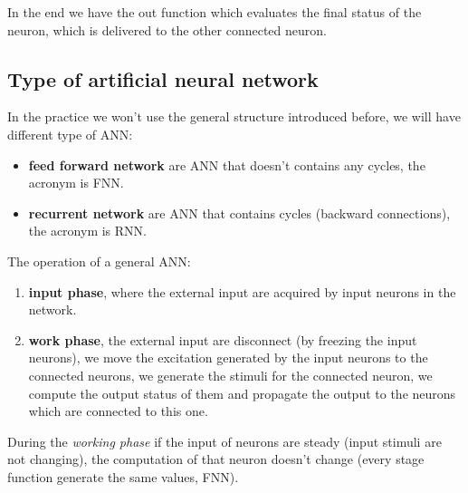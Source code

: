 \documentclass{article}
\begin{document}
In the end we have the out function which evaluates the final status of the neuron, which
is delivered to the other connected neuron.

\subsection{Type of artificial neural network}
In the practice we won't use the general structure introduced before, we will have
different type of ANN:

\begin{itemize}
    \item \textbf{feed forward network} are ANN that doesn't contains any cycles, the
          acronym is FNN.
    \item \textbf{recurrent network} are ANN that contains cycles (backward connections),
          the acronym is RNN.
\end{itemize}

\noindent
The operation of a general ANN:
\begin{enumerate}
    \item \textbf{input phase}, where the external input are acquired by
          input neurons in the network.

    \item \textbf{work phase}, the external input are disconnect (by freezing
          the input neurons), we move the excitation generated by the input neurons
          to the connected neurons, we generate the stimuli for the connected neuron,
          we compute the output status of them and propagate the output to the
          neurons which are connected to this one.
\end{enumerate}

During the \textit{working phase} if the input of neurons are steady (input stimuli
are not changing), the computation of that neuron doesn't change (every stage
function generate the same values, FNN).
\end{document}
